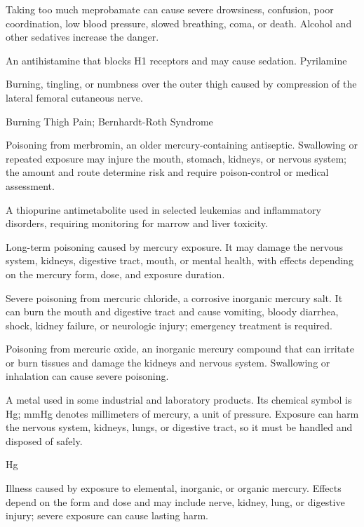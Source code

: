  Taking too much meprobamate can cause severe drowsiness, confusion, poor coordination, low blood pressure, slowed breathing, coma, or death. Alcohol and other sedatives increase the danger.

 An antihistamine that blocks H1 receptors and may cause sedation.
\synonyms
Pyrilamine

 Burning, tingling, or numbness over the outer thigh caused by compression of the lateral femoral cutaneous nerve.

\synonyms
Burning Thigh Pain; Bernhardt-Roth Syndrome

 Poisoning from merbromin, an older mercury-containing antiseptic. Swallowing or repeated exposure may injure the mouth, stomach, kidneys, or nervous system; the amount and route determine risk and require poison-control or medical assessment.

 A thiopurine antimetabolite used in selected leukemias and inflammatory disorders, requiring monitoring for marrow and liver toxicity.

 Long-term poisoning caused by mercury exposure. It may damage the nervous system, kidneys, digestive tract, mouth, or mental health, with effects depending on the mercury form, dose, and exposure duration.

 Severe poisoning from mercuric chloride, a corrosive inorganic mercury salt. It can burn the mouth and digestive tract and cause vomiting, bloody diarrhea, shock, kidney failure, or neurologic injury; emergency treatment is required.

 Poisoning from mercuric oxide, an inorganic mercury compound that can irritate or burn tissues and damage the kidneys and nervous system. Swallowing or inhalation can cause severe poisoning.

 A metal used in some industrial and laboratory products. Its chemical symbol is Hg; mmHg denotes millimeters of mercury, a unit of pressure. Exposure can harm the nervous system, kidneys, lungs, or digestive tract, so it must be handled and disposed of safely.

\synonyms
Hg

 Illness caused by exposure to elemental, inorganic, or organic mercury. Effects depend on the form and dose and may include nerve, kidney, lung, or digestive injury; severe exposure can cause lasting harm.

